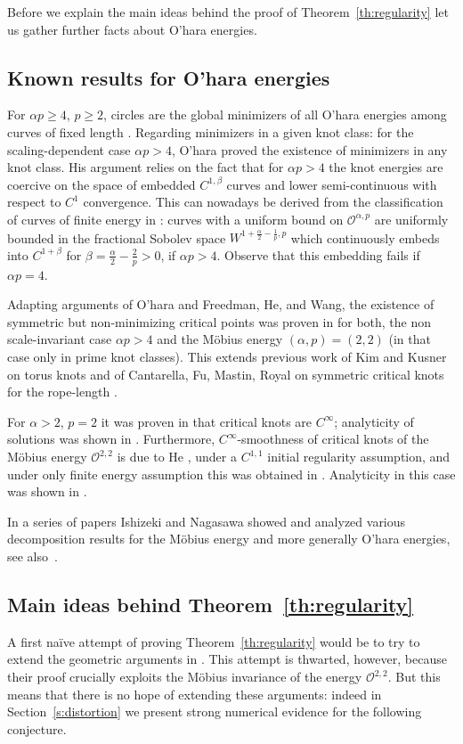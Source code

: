\documentclass[a4paper,10pt,intlimits,ngerman]{amsart}
\numberwithin{equation}{section}
\begin{document}
Before we explain the main ideas behind the proof of Theorem~\ref{th:regularity} let us gather further facts about O'hara energies.
\subsection*{Known results for O'hara energies}
For $\alpha p \geq 4$, $p \geq 2$, circles are the global minimizers of all O'hara energies among curves of fixed length \cite{Abrams2003}. Regarding minimizers in a given knot class: for the scaling-dependent case $\alpha p > 4$, O'hara \cite{OH91,OH92} proved the existence of minimizers in any knot class. His argument relies on the fact that for $\alpha p > 4$ the knot energies are coercive on the space of embedded $C^{1, \beta}$ curves and lower semi-continuous with respect to $C^1$ convergence. This can nowadays be derived from the classification of curves of finite energy in \cite{Blatt12}: curves with a uniform bound on $\mathcal O^{\alpha,p}$ are uniformly bounded in the fractional Sobolev space $W^{1+\frac{\alpha}{2}-\frac{1}{p},p}$ which continuously embeds into $C^{1+\beta}$ for $\beta = \frac \alpha 2 -  \frac 2 p >0$, if $\alpha p > 4$. Observe that this embedding fails if $\alpha p = 4$.

Adapting arguments of O'hara and Freedman, He, and Wang, the existence of symmetric but non-minimizing critical points was proven in  \cite{Gv18,BGRv19} for both, the non scale-invariant case $\alpha p > 4$ and the M\"obius energy $(\alpha,p) = (2,2)$ (in that case only in prime knot classes). This extends previous work of Kim and Kusner on torus knots \cite{Kim1993} and of Cantarella, Fu, Mastin, Royal on symmetric critical knots for the rope-length \cite{Cantarella2014}.

For $\alpha > 2$, $p=2$ it was proven in \cite{BR12} that critical knots are $C^\infty$; analyticity of solutions was shown in \cite{V19}. Furthermore, $C^\infty$-smoothness of critical knots of the M\"obius energy $\mathcal{O}^{2,2}$ is due to He \cite{He00}, under a $C^{1,1}$ initial regularity assumption, and under only finite energy assumption this was obtained in \cite{BRS16}. Analyticity in this case was shown in \cite{BV19}. 

In a series of papers Ishizeki and Nagasawa \cite{IshizekiNagasawa, IshizekiNagasawaII,Ishizeki16, IshizekiNagasawaIII} showed and analyzed various decomposition results for the M\"obius energy and more generally O'hara energies, see also~\cite{N18}.

\subsection*{Main ideas behind Theorem~\ref{th:regularity}}
A first na\"ive attempt of proving Theorem~\ref{th:regularity} would be to try to extend the geometric arguments in \cite{Freedman1994}. This attempt is thwarted, however, because their proof crucially exploits the M\"obius invariance of the energy $\mathcal{O}^{2,2}$. But this means that there is no hope of extending these arguments: indeed in Section~\ref{s:distortion} we present strong numerical evidence for the following conjecture.
\end{document}
